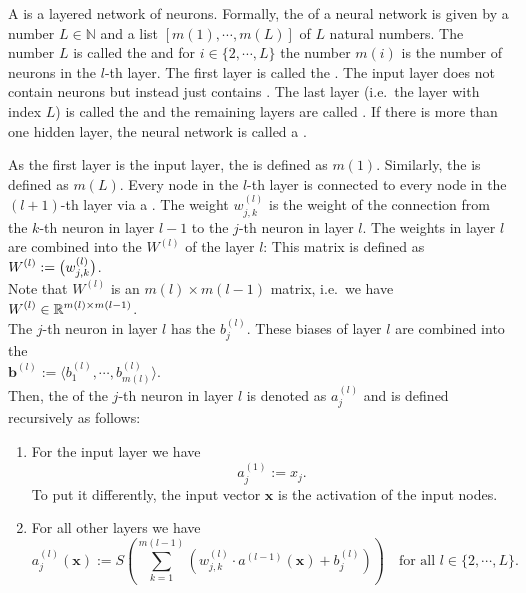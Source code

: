 A  is a layered network of neurons.  Formally, the  of a neural network is
given by a number $L \in \mathbb{N}$ and a list $[m(1), \cdots, m(L)]$ of $L$ natural numbers.  The number
$L$ is called the  and for $i \in \{2,\cdots,L\}$ the number $m(i)$ is the number of
neurons in the $l$-th layer.  The first layer is called the .  The input layer does not contain
neurons but instead just contains .  The last layer (i.e.~the
layer with index $L$) is called the  and the remaining layers are called 
.  If there is more than one hidden layer, the neural network is called a
.

As the first layer is the input layer, the  is defined as
$m(1)$.  Similarly, the  is defined as $m(L)$.
Every node in the $l$-th layer is connected to every node in the $(l+1)$-th layer via a .
The weight $w_{j,k}^{(l)}$ is the weight of the connection from the $k$-th neuron in layer $l-1$ to
the $j$-th neuron in layer $l$.  The weights in layer $l$ are combined into the  $W^{(l)}$ of
the layer $l$: This matrix is defined as
\\[0.2cm]
\hspace*{1.3cm}
$\displaystyle W^{(l)} := \bigl( w_{j,k}^{(l)} \bigr)$.
\\[0.2cm]
Note that $W^{(l)}$ is an $m(l) \times m(l-1)$ matrix, i.e.~we have
\\[0.2cm]
\hspace*{1.3cm}
$\displaystyle W^{(l)} \in \mathbb{R}^{m(l) \times m(l-1)}$.
\\[0.2cm]
The $j$-th neuron in layer $l$ has the  $b_j^{(l)}$.  These biases of layer $l$ are combined into
the 
\\[0.2cm]
\hspace*{1.3cm}
$\mathbf{b}^{(l)} := \langle b_1^{(l)}, \cdots, b_{m(l)}^{(l)} \rangle$.
\\[0.2cm]
Then, the  of the $j$-th neuron
in layer $l$ is denoted as $a_j^{(l)}$ and is defined recursively as follows:
\begin{enumerate}
\item For the input layer we have
      \begin{equation}
        \label{eq:feedforward1}
       a^{(1)}_j := x_j.
      \end{equation}
      To put it differently, the input vector $\mathbf{x}$ is the activation of the input nodes.
\item For all other layers we have
      \begin{equation}
         \label{eq:feedforward2}
         a_j^{(l)}(\mathbf{x}) := 
             S\left(\sum\limits_{k=1}^{m(l-1)} \left(w_{j,k}^{(l)}\cdot a^{(l-1)}(\mathbf{x}) + b_{j}^{(l)}\right)\right) 
        \quad \mbox{for all $l \in \{2, \cdots, L\}$}.
\end{equation}
\end{enumerate}
